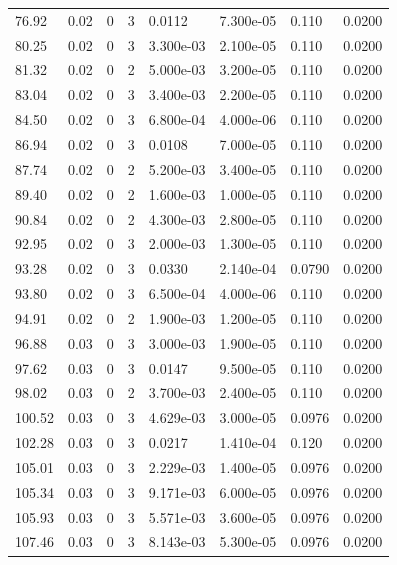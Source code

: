 \documentclass[preview]{standalone}
\begin{document}
{{{\begin{tabular}{L{1.2cm}C{1.2cm} C{0.3cm}C{0.5cm} C{1.4cm}C{1.4cm} C{1.4cm}C{1.4cm}}
  76.92  &  0.02  & 0     &  3 &  0.0112  & 7.300e-05  & 0.110 &  0.0200   \\ 
  80.25  &  0.02  & 0     &  3 &  3.300e-03  & 2.100e-05  & 0.110 &  0.0200   \\ 
  81.32  &  0.02  & 0     &  2 &  5.000e-03  & 3.200e-05  & 0.110 &  0.0200   \\ 
  83.04  &  0.02  & 0     &  3 &  3.400e-03  & 2.200e-05  & 0.110 &  0.0200   \\ 
  84.50  &  0.02  & 0     &  3 &  6.800e-04  & 4.000e-06  & 0.110 &  0.0200   \\ 
  86.94  &  0.02  & 0     &  3 &  0.0108  & 7.000e-05  & 0.110 &  0.0200   \\ 
  87.74  &  0.02  & 0     &  2 &  5.200e-03  & 3.400e-05  & 0.110 &  0.0200   \\ 
  89.40  &  0.02  & 0     &  2 &  1.600e-03  & 1.000e-05  & 0.110 &  0.0200   \\ 
  90.84  &  0.02  & 0     &  2 &  4.300e-03  & 2.800e-05  & 0.110 &  0.0200   \\ 
  92.95  &  0.02  & 0     &  3 &  2.000e-03  & 1.300e-05  & 0.110 &  0.0200   \\ 
  93.28  &  0.02  & 0     &  3 &  0.0330  & 2.140e-04  & 0.0790 &  0.0200   \\ 
  93.80  &  0.02  & 0     &  3 &  6.500e-04  & 4.000e-06  & 0.110 &  0.0200   \\ 
  94.91  &  0.02  & 0     &  2 &  1.900e-03  & 1.200e-05  & 0.110 &  0.0200   \\ 
  96.88  &  0.03  & 0     &  3 &  3.000e-03  & 1.900e-05  & 0.110 &  0.0200   \\ 
  97.62  &  0.03  & 0     &  3 &  0.0147  & 9.500e-05  & 0.110 &  0.0200   \\ 
  98.02  &  0.03  & 0     &  2 &  3.700e-03  & 2.400e-05  & 0.110 &  0.0200   \\ 
  100.52  &  0.03  & 0     &  3 &  4.629e-03  & 3.000e-05  & 0.0976 &  0.0200   \\ 
  102.28  &  0.03  & 0     &  3 &  0.0217  & 1.410e-04  & 0.120 &  0.0200   \\ 
  105.01  &  0.03  & 0     &  3 &  2.229e-03  & 1.400e-05  & 0.0976 &  0.0200   \\ 
  105.34  &  0.03  & 0     &  3 &  9.171e-03  & 6.000e-05  & 0.0976 &  0.0200   \\ 
  105.93  &  0.03  & 0     &  3 &  5.571e-03  & 3.600e-05  & 0.0976 &  0.0200   \\ 
  107.46  &  0.03  & 0     &  3 &  8.143e-03  & 5.300e-05  & 0.0976 &  0.0200   \\ 

\end{tabular}}}}
\end{document}
